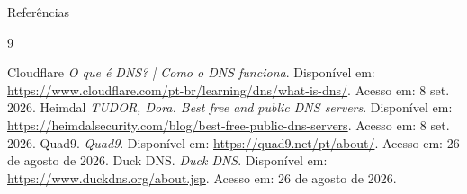 \documentclass{if-beamer}
\begin{document}
    

\begin{frame}[allowframebreaks]{Referências}
	\begin{thebibliography}{9}
		
		Cloudflare	\textit{O que é DNS? | Como o DNS funciona}. Disponível em: \url{https://www.cloudflare.com/pt-br/learning/dns/what-is-dns/}. Acesso em: 8 set. 2026.
		Heimdal \textit{TUDOR, Dora. Best free and public DNS servers}. Disponível em: \url{https://heimdalsecurity.com/blog/best-free-public-dns-servers}. Acesso em: 8 set. 2026.
		Quad9. \textit{Quad9}. Disponível em: \url{https://quad9.net/pt/about/}. Acesso em: 26 de agosto de 2026.
		Duck DNS. \textit{Duck DNS}. Disponível em: \url{https://www.duckdns.org/about.jsp}. Acesso em: 26 de agosto de 2026.
	
	\end{thebibliography}
\end{frame}	
\end{document}
